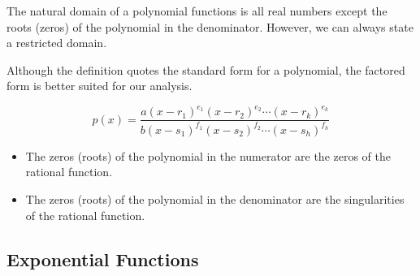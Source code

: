 \documentclass{ximera}
\begin{document}
The natural domain of a polynomial functions is all real numbers except the roots (zeros) of the polynomial in the denominator.  However, we can always state a restricted domain.








Although the definition quotes the standard form for a polynomial, the factored form is better suited for our analysis.

\[
p(x) = \frac{ a (x - r_1)^{e_1} (x - r_2)^{e_2} \cdots  (x - r_k)^{e_k} } { b (x - s_1)^{f_1} (x - s_2)^{f_2} \cdots  (x - s_h)^{f_h} }
\]








\begin{itemize}
\item The zeros (roots) of the polynomial in the numerator are the zeros of the rational function.
\item The zeros (roots) of the polynomial in the denominator are the singularities of the rational function.
\end{itemize}





















\subsection*{Exponential Functions}
\end{document}
